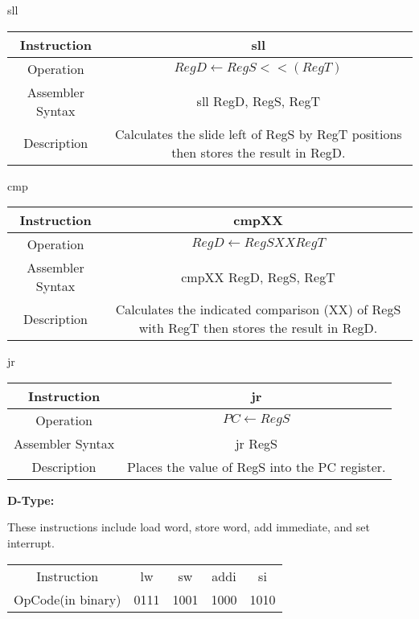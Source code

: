 \documentclass[]{article}
\begin{document}
sll\\
\begin{tabular}{c|c}\hline
	Instruction & sll\\\hline
	Operation & $RegD \leftarrow RegS <<(RegT)$\\\hline
	Assembler Syntax & sll RegD, RegS, RegT\\\hline
	Description & Calculates the slide left of RegS by RegT positions then stores the result in RegD.\\\hline
\end{tabular}\vspace{1.5cm}

	cmp\\
	\begin{tabular}{c|c}\hline
		Instruction & cmpXX\\\hline
		Operation & $RegD \leftarrow RegS XX RegT$\\\hline
		Assembler Syntax & cmpXX RegD, RegS, RegT\\\hline
		Description & Calculates the indicated comparison (XX) of RegS with RegT then stores the result in RegD.\\\hline
	\end{tabular}\vspace{1.5cm}

	jr\\
	\begin{tabular}{c|c}\hline
		Instruction & jr\\\hline
		Operation & $PC \leftarrow RegS$\\\hline
		Assembler Syntax & jr RegS\\\hline
		Description & Places the value of RegS into the PC register.\\\hline
	\end{tabular}\vspace{1.5cm}
\pagebreak



\pagebreak

{\Large
	\textbf{
		D-Type:
	}
}

\noindent These instructions include load word, store word, add immediate, and set interrupt.

\begin{center}
	\begin{tabular}{|c|c|c|c|c|}\cline{1-5}
	Instruction & lw & sw & addi & si\\\cline{1-5}\hfill
	OpCode(in binary) & 0111 & 1001 & 1000 & 1010 \\\cline{1-5}
	\end{tabular}\vspace{1.5cm}
\end{center}
\end{document}
